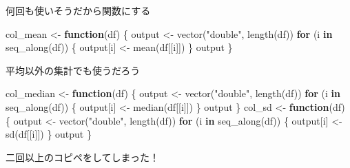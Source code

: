 \documentclass[
  ignorenonframetext,
  aspectratio=169]{beamer}
\newenvironment{Shaded}{\begin{snugshade}}{\end{snugshade}}
\newcommand{\ControlFlowTok}[1]{\textcolor[rgb]{0.13,0.29,0.53}{\textbf{#1}}}
\newcommand{\FunctionTok}[1]{\textcolor[rgb]{0.00,0.00,0.00}{#1}}
\newcommand{\NormalTok}[1]{#1}
\newcommand{\OtherTok}[1]{\textcolor[rgb]{0.56,0.35,0.01}{#1}}
\newcommand{\StringTok}[1]{\textcolor[rgb]{0.31,0.60,0.02}{#1}}
\begin{document}
\begin{frame}[fragile]{何回も使いそうだから関数にする}
\protect\hypertarget{ux4f55ux56deux3082ux4f7fux3044ux305dux3046ux3060ux304bux3089ux95a2ux6570ux306bux3059ux308b}{}
\begin{Shaded}
\begin{Highlighting}[]
\NormalTok{col\_mean }\OtherTok{\textless{}{-}} \ControlFlowTok{function}\NormalTok{(df) \{}
\NormalTok{    output }\OtherTok{\textless{}{-}} \FunctionTok{vector}\NormalTok{(}\StringTok{"double"}\NormalTok{, }\FunctionTok{length}\NormalTok{(df))}
  \ControlFlowTok{for}\NormalTok{ (i }\ControlFlowTok{in} \FunctionTok{seq\_along}\NormalTok{(df)) \{}
\NormalTok{        output[i] }\OtherTok{\textless{}{-}} \FunctionTok{mean}\NormalTok{(df[[i]])}
\NormalTok{    \}}
\NormalTok{    output}
\NormalTok{\}}
\end{Highlighting}
\end{Shaded}
\end{frame}

\begin{frame}[fragile]{平均以外の集計でも使うだろう}
\protect\hypertarget{ux5e73ux5747ux4ee5ux5916ux306eux96c6ux8a08ux3067ux3082ux4f7fux3046ux3060ux308dux3046}{}
\begin{Shaded}
\begin{Highlighting}[]
\NormalTok{col\_median }\OtherTok{\textless{}{-}} \ControlFlowTok{function}\NormalTok{(df) \{}
\NormalTok{    output }\OtherTok{\textless{}{-}} \FunctionTok{vector}\NormalTok{(}\StringTok{"double"}\NormalTok{, }\FunctionTok{length}\NormalTok{(df))}
  \ControlFlowTok{for}\NormalTok{ (i }\ControlFlowTok{in} \FunctionTok{seq\_along}\NormalTok{(df)) \{}
\NormalTok{        output[i] }\OtherTok{\textless{}{-}} \FunctionTok{median}\NormalTok{(df[[i]])}
\NormalTok{    \}}
\NormalTok{    output}
\NormalTok{\}}
\NormalTok{col\_sd }\OtherTok{\textless{}{-}} \ControlFlowTok{function}\NormalTok{(df) \{}
\NormalTok{    output }\OtherTok{\textless{}{-}} \FunctionTok{vector}\NormalTok{(}\StringTok{"double"}\NormalTok{, }\FunctionTok{length}\NormalTok{(df))}
  \ControlFlowTok{for}\NormalTok{ (i }\ControlFlowTok{in} \FunctionTok{seq\_along}\NormalTok{(df)) \{}
\NormalTok{        output[i] }\OtherTok{\textless{}{-}} \FunctionTok{sd}\NormalTok{(df[[i]])}
\NormalTok{    \}}
\NormalTok{    output}
\NormalTok{\}}
\end{Highlighting}
\end{Shaded}

二回以上のコピペをしてしまった！
\end{frame}
\end{document}
